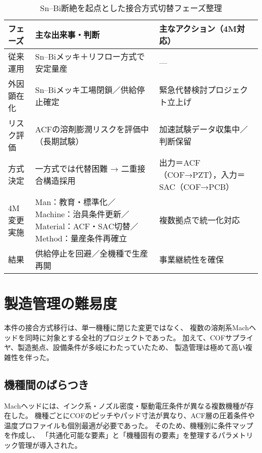 \documentclass[conference]{IEEEtran}
\begin{document}
\begin{table}[t]
\centering
\footnotesize
\caption{Sn–Bi断絶を起点とした接合方式切替フェーズ整理}
\label{tab:flow}
\renewcommand{\arraystretch}{1.1}
\begin{tabularx}{\columnwidth}{@{}p{1.9cm} Y Y@{}}
\toprule
フェーズ & 主な出来事・判断 & 主なアクション（4M対応） \\
\midrule
従来運用 &
Sn–Biメッキ＋リフロー方式で安定量産 &
— \\
\addlinespace[2pt]
外因顕在化 &
Sn–Biメッキ工場閉鎖／供給停止確定 &
緊急代替検討プロジェクト立上げ \\
\addlinespace[2pt]
リスク評価 &
ACFの溶剤膨潤リスクを評価中（長期試験） &
加速試験データ収集中／判断保留 \\
\addlinespace[2pt]
方式決定 &
一方式では代替困難 → 二重接合構造採用 &
出力＝ACF（COF→PZT），入力＝SAC（COF→PCB） \\
\addlinespace[2pt]
4M変更実施 &
Man：教育・標準化／Machine：治具条件更新／Material：ACF・SAC切替／Method：量産条件再確立 &
複数拠点で統一化対応 \\
\addlinespace[2pt]
結果 &
供給停止を回避／全機種で生産再開 &
事業継続性を確保 \\
\bottomrule
\end{tabularx}
\end{table}

\section{製造管理の難易度}

本件の接合方式移行は、単一機種に閉じた変更ではなく、  
複数の溶剤系Machヘッドを同時に対象とする全社的プロジェクトであった。  
加えて、COFサプライヤ、製造拠点、設備条件が多岐にわたっていたため、  
製造管理は極めて高い複雑性を伴った。

\subsection{機種間のばらつき}
Machヘッドには、インク系・ノズル密度・駆動電圧条件が異なる複数機種が存在した。  
機種ごとにCOFのピッチやパッド寸法が異なり、ACF層の圧着条件や温度プロファイルも個別最適が必要であった。  
そのため、機種別に条件マップを作成し、  
「共通化可能な要素」と「機種固有の要素」を整理するパラメトリック管理が導入された。

\end{document}
